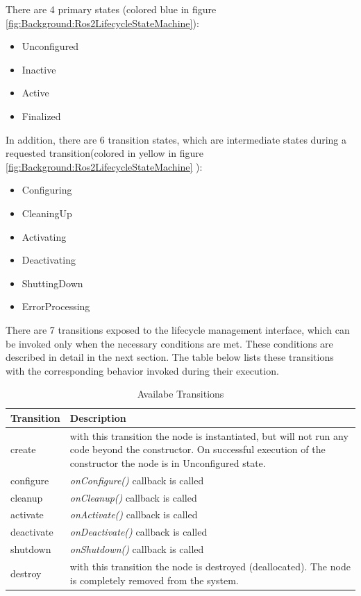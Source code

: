 	There are 4 primary states (colored blue in figure \ref*{fig:Background:Ros2LifecycleStateMachine}):
	\begin{itemize}
		\item Unconfigured
		\item Inactive
		\item Active
		\item Finalized
	\end{itemize}
	In addition, there are 6 transition states, which are intermediate states during a requested transition(colored in yellow in figure \ref*{fig:Background:Ros2LifecycleStateMachine} ):
	\begin{itemize}
		\item Configuring
		\item CleaningUp
		\item Activating
		\item Deactivating
		\item ShuttingDown
		\item ErrorProcessing
	\end{itemize}
	There are 7 transitions exposed to the lifecycle management interface, which can be invoked only when the necessary conditions are met. These conditions are described in detail in the next section. The table below lists these transitions with the corresponding behavior invoked during their execution.
	\begin{table}[H]
		\centering
		\caption{Availabe Transitions}
		\label{tab:Valid transitions}
		\begin{tabular}{|p{2cm}|p{9cm}|}
			\toprule
			Transition & Description\\
			\midrule
			create & with this transition the node is instantiated, but will not run any code beyond the constructor. On successful execution of the constructor the node is in Unconfigured state. \\
			configure & \textit{onConfigure()} callback is called\\
			cleanup & \textit{onCleanup()} callback is called\\
			activate & \textit{onActivate()} callback is called\\
			deactivate & \textit{onDeactivate()} callback is called\\
			shutdown & \textit{onShutdown()} callback is called\\
			destroy & with this transition the node is destroyed (deallocated). The node is completely removed from the system. \\
			\bottomrule
		\end{tabular}
	\end{table}

